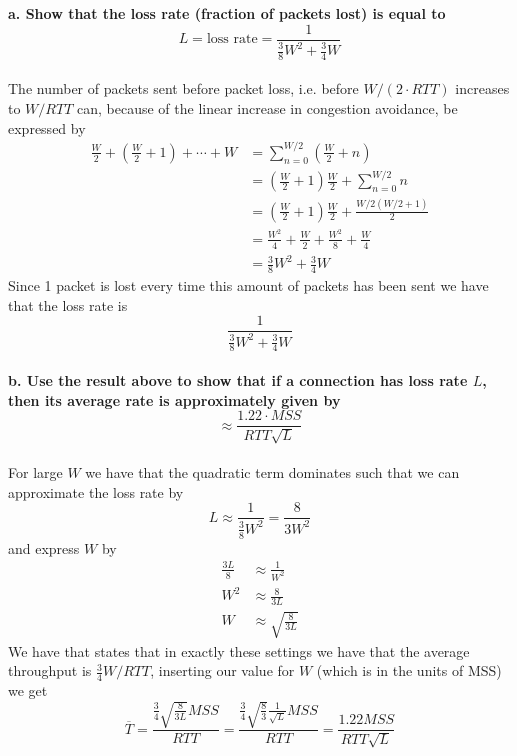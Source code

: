 \textbf{a. Show that the loss rate (fraction of packets lost) is equal to}
\begin{equation*}
    L = \text{loss rate} = \frac{1}{\frac{3}{8} W^2 + \frac{3}{4}W}
\end{equation*}
\\
The number of packets sent before packet loss, i.e. before $W/(2 \cdot RTT)$ increases to $W/RTT$ can, because of the linear increase in congestion avoidance, be expressed by 
\begin{equation*}
\begin{split}
    \frac{W}{2}+\left(\frac{W}{2}+1\right)+\cdots+W & =\sum_{n=0}^{W / 2}\left(\frac{W}{2}+n\right) \\
    & =\left(\frac{W}{2}+1\right) \frac{W}{2}+\sum_{n=0}^{W / 2} n \\
    & =\left(\frac{W}{2}+1\right) \frac{W}{2}+\frac{W / 2(W / 2+1)}{2} \\
    & =\frac{W^2}{4}+\frac{W}{2}+\frac{W^2}{8}+\frac{W}{4} \\
    & =\frac{3}{8} W^2+\frac{3}{4} W
\end{split}
\end{equation*} 
Since 1 packet is lost every time this amount of packets has been sent we have that the loss rate is
\begin{equation*}
    \frac{1}{\frac{3}{8} W^2+\frac{3}{4} W}
\end{equation*}
\\
\textbf{b. Use the result above to show that if a connection has loss rate $L$, then its average rate is approximately given by}
\begin{equation*}
    \approx \frac{1.22 \cdot MSS}{RTT \sqrt{L}}
\end{equation*}
\\
For large $W$ we have that the quadratic term dominates such that we can approximate the loss rate by 
\begin{equation*}
    L \approx \frac{1}{\frac{3}{8}W^2} = \frac{8}{3W^2}  
\end{equation*}
and express $W$ by 
\begin{equation*}
\begin{split}
    \frac{3L}{8} &\approx \frac{1}{W^2} \\
    W^2 &\approx \frac{8}{3L} \\
    W &\approx \sqrt{\frac{8}{3L}}
\end{split}
\end{equation*}
We have that \cite{kr} states that in exactly these settings we have that the average throughput is $\frac{3}{4}W/RTT$, inserting our value for $W$ (which is in the units of MSS) we get
\begin{equation}
  \label{eq:avg_throughput_with_loss}
    \overline{T} = \frac{\frac{3}{4} \sqrt{\frac{8}{3L}} MSS}{RTT} = \frac{\frac{3}{4} \sqrt{\frac{8}{3}} \frac{1}{\sqrt{L}} MSS}{RTT} = \frac{1.22 MSS}{RTT \sqrt{L}}
\end{equation}



